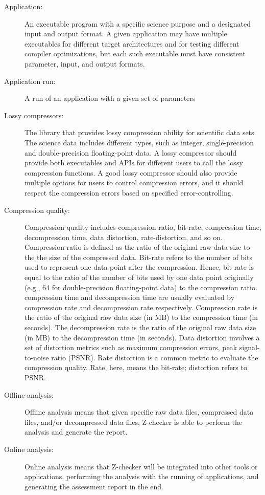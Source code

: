 \begin{description}

\item[Application:] An executable program with a specific science purpose and a
designated input and output format. A given application may have multiple
executables for different target architectures and for testing different
compiler optimizations, but each such executable must have consistent
parameter, input, and output formats.

\item[Application run:] A run of an application with a given set of parameters

\item[Lossy compressors:] The library that provides lossy compression ability for scientific data sets. The science data includes different types, such as integer, single-precision and double-precision floating-point data. A lossy compressor should provide both executables and APIs for different users to call the lossy compression functions. A good lossy compressor should also provide multiple options for users to control compression errors, and it should respect the compression errors based on specified error-controlling.

\item[Compression quality:] Compression quality includes compression ratio, bit-rate, compression time, decompression time, data distortion, rate-distortion, and so on. Compression ratio is defined as the ratio of the original raw data size to the the size of the compressed data. Bit-rate refers to the number of bits used to represent one data point after the compression. Hence, bit-rate is equal to the ratio of the number of bits used by one data point originally (e.g., 64 for double-precision floating-point data) to the compression ratio. compression time and decompression time are usually evaluated by compression rate and decompression rate respectively. Compression rate is the ratio of the original raw data size (in MB) to the compression time (in seconds). The decompression rate is the ratio of the original raw data size (in MB) to the decompression time (in seconds). Data distortion involves a set of distortion metrics such as maximum compression errors, peak signal-to-noise ratio (PSNR). Rate distortion is a common metric to evaluate the compression quality. Rate, here, means the bit-rate; distortion refers to PSNR.


\item[Offline analysis:] Offline analysis means that given specific raw data files, compressed data files, and/or decompressed data files, Z-checker is able to perform the analysis and generate the report.

\item[Online analysis:] Online analysis means that Z-checker will be integrated into other tools or applications, performing the analysis with the running of applications, and generating the assessment report in the end.

\end{description}

